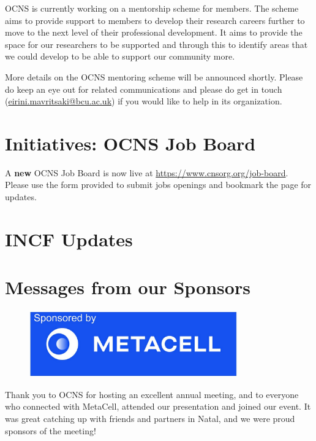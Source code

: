 \documentclass[11pt,a4paper,oneside]{article}
\begin{document}
OCNS is currently working on a mentorship scheme for members.
The scheme aims to provide support to members to develop their research careers further to move to the next level of their professional development.
It aims to provide the space for our researchers to be supported and through this to identify areas that we could develop to be able to support our community more.

More details on the OCNS mentoring scheme will be announced shortly.
Please do keep an eye out for related communications and please do get in touch (\href{mailto:eirini.mavritsaki@bcu.ac.uk}{eirini.mavritsaki@bcu.ac.uk}) if you would like to help in its organization.

\vspace{7ex}
\section*{Initiatives: OCNS Job Board}%
\sectionauthor{\vspace{-4ex}}

A \textbf{new} OCNS Job Board is now live at \url{https://www.cnsorg.org/job-board}.
Please use the form provided to submit jobs openings and bookmark the page for updates.


\clearpage
\section*{INCF Updates}%
\lipsum[1-3]

\clearpage

\clearpage

\clearpage
\section*{Messages from our Sponsors}%
\sectionauthor{\vspace{-4ex}}
\begin{figure}[!h]
  \centering
  \includegraphics[width=0.8\textwidth]{images/Metacel_logo_2_crop}
\end{figure}

Thank you to OCNS for hosting an excellent annual meeting, and to everyone who connected with MetaCell, attended our presentation and joined our event.
It was great catching up with friends and partners in Natal, and we were proud sponsors of the meeting!
\end{document}
